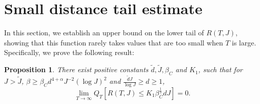 \documentclass[12pt]{amsart}
\newtheorem{prop}{Proposition}[section]
\numberwithin{equation}{section}
\newcommand{\1}{\mathbf{1}}
\begin{document}
\section{Small distance tail estimate}
\label{Small distance tail estimate}
In this section, we establish an upper bound on the lower tail of $R(T,J)$, showing that this function rarely takes values that are too small when $T$ is large. Specifically, we prove the following result:
\begin{prop}
\label{lower}
    There exist positive constants $\tilde{d}, \tilde{J}, \beta_C$ and $K_1$, such that for $J>\tilde{J}$, $\beta \geq\beta_Cd^{4+\alpha}J^{-2}(\log J)^{2}$ and $\frac{\tilde{d}J}{\log J}\geq d\geq 1$,
    \begin{equation*}
    \lim_{T\to \infty}Q_T\left[R(T,J)\leq K_1\beta_C^{\frac{1}{3}}d J\right]=0.
\end{equation*}
\end{prop}
\end{document}

